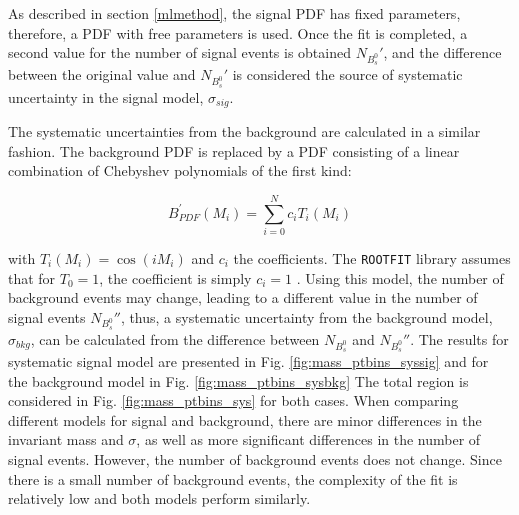 As described in section \ref{mlmethod}, the signal PDF has fixed parameters, therefore, a PDF with free parameters is used. Once the fit is completed, a second value for the number of signal events is obtained $N_{B_s^{0}}'$, and the difference between the original value and $N_{B_s^{0}}'$ is considered the source of systematic uncertainty in the signal model, $\sigma_{sig}$.

The systematic uncertainties from the background are calculated in a similar fashion. The background PDF is replaced by a PDF consisting of a linear combination of Chebyshev polynomials of the first kind:

\begin{equation}
	B_{PDF}^{'}(M_i) = \sum_{i=0}^{N} c_i T_i(M_i) 
\end{equation}

with \cite{mason2002chebyshev} $T_i(M_i) = \cos(iM_i)$ and $c_i$ the coefficients. The \verb|ROOTFIT| library assumes that for $T_0 = 1$, the coefficient is simply $c_i = 1$ \cite{chebyshev}. Using this model, the number of background events may change, leading to a different value in the number of signal events  $N_{B_s^{0}}''$, thus, a systematic uncertainty from the background model, $\sigma_{bkg}$, can be calculated from the difference between $N_{B_s^{0}}$ and $N_{B_s^{0}}''$. The results for systematic signal model are presented in Fig. \ref{fig:mass_ptbins_syssig} and for the background model in Fig. \ref{fig:mass_ptbins_sysbkg} The total region is considered in Fig. \ref{fig:mass_ptbins_sys} for both cases. When comparing different models for signal and background, there are minor differences in the invariant mass and $\sigma$, as well as more significant differences in the number of signal events. However, the number of background events does not change. Since there is a small number of background events, the complexity of the fit is relatively low and both models perform similarly.

